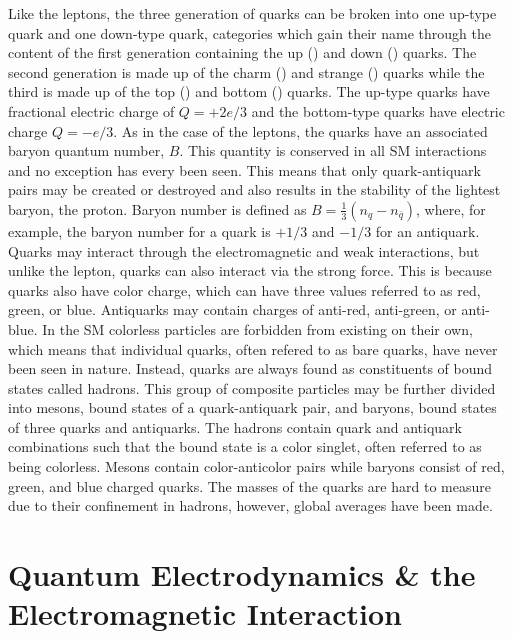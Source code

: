 Like the leptons, the three generation of quarks can be broken into one up-type quark and one down-type quark, categories which gain their name through the content of the first generation containing the up (\cPqu) and down (\cPqd) quarks.
The second generation is made up of the charm (\cPqc) and strange (\cPqs) quarks while the third is made up of the top (\cPqt) and bottom (\cPqb) quarks.
The up-type quarks have fractional electric charge of $Q=+2e/3$ and the bottom-type quarks have electric charge $Q=-e/3$.
As in the case of the leptons, the quarks have an associated baryon quantum number, $B$.
This quantity is conserved in all SM interactions and no exception has every been seen.
This means that only quark-antiquark pairs may be created or destroyed and also results in the stability of the lightest baryon, the proton.
Baryon number is defined as $B=\frac{1}{3}\left(n_{q}-n_{\bar{q}}\right)$, where, for example, the baryon number for a quark is $+1/3$ and $-1/3$ for an antiquark.
Quarks may interact through the electromagnetic and weak interactions, but unlike the lepton, quarks can also interact via the strong force.
This is because quarks also have color charge, which can have three values referred to as red, green, or blue. 
Antiquarks may contain charges of anti-red, anti-green, or anti-blue.
In the SM colorless particles are forbidden from existing on their own, which means that individual quarks, often refered to as bare quarks, have never been seen in nature.
Instead, quarks are always found as constituents of bound states called hadrons.
This group of composite particles may be further divided into mesons, bound states of a quark-antiquark pair, and baryons, bound states of three quarks and antiquarks.
The hadrons contain quark and antiquark combinations such that the bound state is a color singlet, often referred to as being colorless.
Mesons contain color-anticolor pairs while baryons consist of red, green, and blue charged quarks.
The masses of the quarks are hard to measure due to their confinement in hadrons, however, global averages have been made.

\section{Quantum Electrodynamics \& the Electromagnetic Interaction}
\label{sec:QED}

